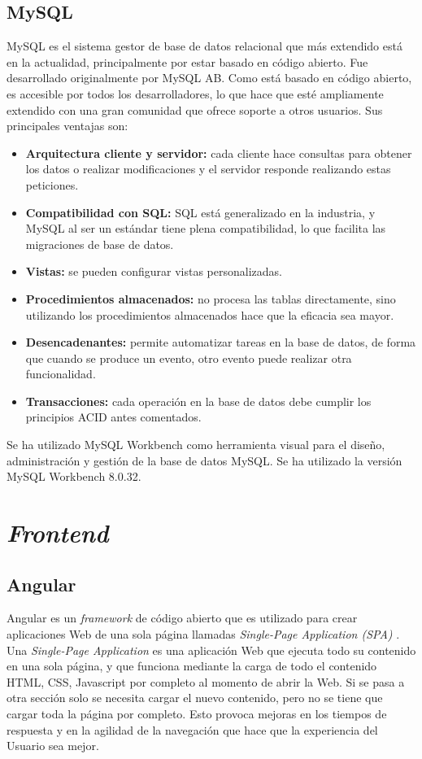 \subsection{MySQL}
MySQL \cite{MySQL} es el sistema gestor de base de datos relacional que más extendido está en la actualidad, principalmente por estar basado en código abierto. Fue desarrollado originalmente por MySQL AB. Como está basado en código abierto, es accesible por todos los desarrolladores, lo que hace que esté ampliamente extendido con una gran comunidad que ofrece soporte a otros usuarios. Sus principales ventajas son: 
\begin{itemize}
    \item \textbf{Arquitectura cliente y servidor:} cada cliente hace consultas para obtener los datos o realizar modificaciones y el servidor responde realizando estas peticiones.
    \item \textbf{Compatibilidad con SQL:} SQL está generalizado en la industria, y MySQL al ser un estándar tiene plena compatibilidad, lo que facilita las migraciones de base de datos. 
    \item \textbf{Vistas:} se pueden configurar vistas personalizadas.
    \item \textbf{Procedimientos almacenados:} no procesa las tablas directamente, sino utilizando los procedimientos almacenados hace que la eficacia sea mayor.
    \item \textbf{Desencadenantes:} permite automatizar tareas en la base de datos, de forma que cuando se produce un evento, otro evento puede realizar otra funcionalidad.
    \item \textbf{Transacciones:} cada operación en la base de datos debe cumplir los principios ACID antes comentados. 
\end{itemize}

Se ha utilizado MySQL Workbench como herramienta visual para el diseño, administración y gestión de la base de datos MySQL. Se ha utilizado la versión MySQL Workbench 8.0.32.



\section{\textit{Frontend}}
\subsection{Angular}
\label{sec:angular}
Angular \cite{angular} \cite{angular1} es un \textit{framework} de código abierto que es utilizado para crear aplicaciones Web de una sola página llamadas \textit{Single-Page Application (SPA)} \cite{SPA}. Una \textit{Single-Page Application} es una aplicación Web que ejecuta todo su contenido en una sola página, y que funciona mediante la carga de todo el contenido HTML, CSS, Javascript por completo al momento de abrir la Web. Si se pasa a otra sección solo se necesita cargar el nuevo contenido, pero no se tiene que cargar toda la página por completo. Esto provoca mejoras en los tiempos de respuesta y en la agilidad de la navegación que hace que la experiencia del Usuario sea mejor.  


